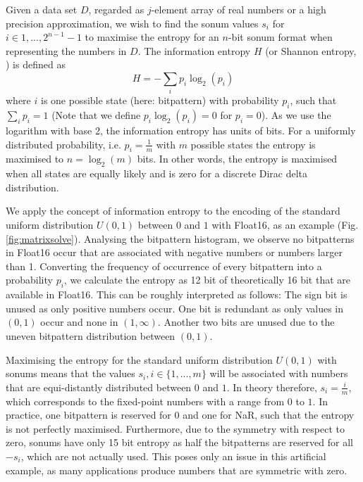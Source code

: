 Given a data set $D$, regarded as $j$-element array of real numbers or a high precision approximation, we wish to find the sonum values $s_i$ for $i \in {1,...,2^{n-1}-1}$ to maximise the entropy for an $n$-bit sonum format when representing the numbers in $D$. The information entropy $H$ (or Shannon entropy, \cite{MacKay2003}) is defined as
\begin{equation}
     H = -\sum_i p_i \log_2(p_i)
     \label{eq:entropy}
\end{equation}
where $i$ is one possible state (here: bitpattern) with probability $p_i$, such that $\sum_ip_i = 1$ (Note that we define $p_i \log_2(p_i) = 0$ for $p_i = 0$). As we use the logarithm with base 2, the information entropy has units of bits. For a uniformly distributed probability, i.e. $p_i = \tfrac{1}{m}$ with $m$ possible states the entropy is maximised to $n = \log_2(m)$ bits. In other words, the entropy is maximised when all states are equally likely and is zero for a discrete Dirac delta distribution.

We apply the concept of information entropy to the encoding of the standard uniform distribution $U(0,1)$ between $0$ and $1$ with Float16, as an example (Fig. \ref{fig:matrixsolve}). Analysing the bitpattern histogram, we observe no bitpatterns in Float16 occur that are associated with negative numbers or numbers larger than 1. Converting the frequency of occurrence of every bitpattern into a probability $p_i$, we calculate the entropy as 12 bit of theoretically 16 bit that are available in Float16. This can be roughly interpreted as follows: The sign bit is unused as only positive numbers occur. One bit is redundant as only values in $(0,1)$ occur and none in $(1,\infty)$. Another two bits are unused due to the uneven bitpattern distribution between $(0,1)$.

Maximising the entropy for the standard uniform distribution $U(0,1)$ with sonums means that the values $s_i, i \in \{1,...,m\}$ will be associated with numbers that are equi-distantly distributed between $0$ and $1$. In theory therefore, $s_i = \tfrac{i}{m}$, which corresponds to the fixed-point numbers with a range from $0$ to $1$. In practice, one bitpattern is reserved for $0$ and one for NaR, such that the entropy is not perfectly maximised. Furthermore, due to the symmetry with respect to zero, sonums have only 15 bit entropy as half the bitpatterns are reserved for all $-s_i$, which are not actually used. This poses only an issue in this artificial example, as many applications produce numbers that are symmetric with zero.

